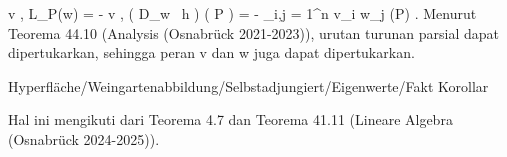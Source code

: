 {\mavergleichskettealign
{\vergleichskettealign
{ \left\langle  v  ,  L_P(w)  \right\rangle
}
{ =} { - {  } \left\langle  v  ,  \left(  D_{w}
 \,  h   \right) \left(   P   \right)   \right\rangle
}
{ =} { -  {  }  \sum_{i,j = 1}^n v_i  w_j  {  } {  }  (P)
}
{ } {
}
{ } {
}
}
{}
{}{.}
Menurut
Teorema 44.10 (Analysis (Osnabrück 2021-2023)),
urutan turunan parsial dapat dipertukarkan, sehingga peran
\mathkor {} {v} {dan} {w} {}
juga dapat dipertukarkan.

}



{Hyperfläche/Weingartenabbildung/Selbstadjungiert/Eigenwerte/Fakt}
{Korollar}
{}
{

\faktzusatz {}
\faktzusatz {}

}
{

Hal ini mengikuti dari
Teorema 4.7
dan
Teorema 41.11 (Lineare Algebra (Osnabrück 2024-2025)).

}



